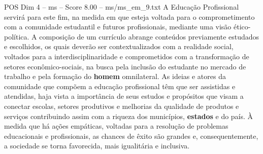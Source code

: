 \begin{textsample}{POS Dim 4 – ms – Score 8.00 – ms/ms\_em\_9.txt}
A Educação Profissional servirá para este fim, na medida em que esteja voltada para o comprometimento com a comunidade estudantil e futuros profissionais, mediante uma visão ético-política.
A composição de um currículo abrange conteúdos previamente estudados e escolhidos, os quais deverão ser contextualizados com a realidade social, voltados para a interdisciplinaridade e comprometidos com a transformação de setores econômico-sociais, na busca pela inclusão do estudante no mercado de trabalho e pela formação do \textbf{homem} omnilateral.
As ideias e atores da comunidade que compõem a educação profissional têm que ser assistidas e atendidas, haja vista a importância de seus estudos e propósitos que visam a conectar escolas, setores produtivos e melhorias da qualidade de produtos e serviços contribuindo assim com a riqueza dos municípios, \textbf{estados} e do país.
À medida que há ações empáticas, voltadas para a resolução de problemas educacionais e profissionais, as chances de êxito são grandes e, consequentemente, a sociedade se torna favorecida, mais igualitária e inclusiva.

\end{textsample}
